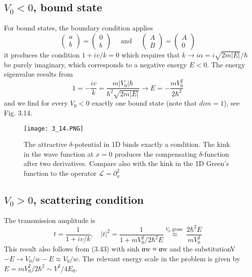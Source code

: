 \subsection{$V_0 <0$, bound state}
For bound states, the boundary condition applies
\begin{equation}
\left(\begin{array}{l}{a} \\ {b}\end{array}\right)=\left(\begin{array}{l}{0} \\ {b}\end{array}\right) \quad \text { and } \quad\left(\begin{array}{l}{A} \\ {B}\end{array}\right)=\left(\begin{array}{l}{A} \\ {0}\end{array}\right)
\end{equation}
it produces the condition $1 + iv / k = 0$ which requires that $k \to i\alpha = i\sqrt{2m | E |} / \hbar$ be purely imaginary, which corresponds to a negative energy $E <0$. The energy eigenvalue results from
\begin{equation}
    1=-\frac{i v}{k}=\frac{m\left|V_{0}\right| \hbar}{\hbar^{2} \sqrt{2 m|E|}} \rightarrow E=-\frac{m V_{0}^{2}}{2 \hbar^{2}}
    \end{equation}
and we find for every $V_0 <0$ exactly one bound state (note that $dim = 1$), see Fig. 3.14.
\begin{figure}[ht]
    \begin{minipage}{0.5\textwidth}
        \centering
        \texttt{[image: 3\_14.PNG]}
    \end{minipage}
    \begin{minipage}{0.5\textwidth}
        \caption{The attractive $\delta$-potential in 1D binds exactly a condition. The kink in the wave function at $x = 0$ produces the compensating $\delta$-function after two derivatives. Compare also with the kink in the 1D Green's function to the operator $\mathcal{L}=\partial_x^2$}
    \end{minipage}
\end{figure}
\subsection{$V_0> 0$, scattering condition}
The transmission amplitude is
\begin{equation}
    t=\frac{1}{1+i v / k}, \quad|t|^{2}=\frac{1}{1+m V_{0}^{2} / 2 \hbar^{2} E}\overset{V_0 \text{ gross }}{\approx}\frac{2\hbar^2 E}{mV_0^2}
    \end{equation}
This result also follows from (3.43) with sinh αw ≈ αw and the substitutionV $-E \to V_0 / w-E \approx V_0 / w$. The relevant energy scale in the problem is given by $E = mV_0^2/2\hbar^2\sim V^2 / 4E_0$.
